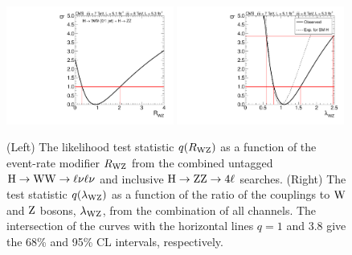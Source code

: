 \documentclass[12pt,twoside,a4paper,cmspaper,final,collab]{cms-tdr}
\begin{document}
\begin{figure}[bhtp]
\centering
\includegraphics[width=0.49\textwidth]{figures/comb/sqr_rwz_scan_1d_ggH_HPA} \hfill
\includegraphics[width=0.49\textwidth]{figures/comb/sqr_lwz_scan_1d_all}
\caption{
(Left) The likelihood test statistic $q(R_{\mathrm{W}\mathrm{Z}})$ as a function of the event-rate modifier $R_{\mathrm{W}\mathrm{Z}}$
from the combined untagged $\mathrm{H} \to \mathrm{W}\mathrm{W} \to \ell\nu\ell\nu$ and
inclusive $\mathrm{H} \to \mathrm{Z}\mathrm{Z} \to  4\ell$ searches.
(Right) The test statistic  $q(\lambda_{\mathrm{W}\mathrm{Z}})$  as a function of the ratio of the couplings to $\mathrm{W}$ and $\mathrm{Z}$
 bosons, $\lambda_{\mathrm{W}\mathrm{Z}}$,
   from the combination of all channels.
The intersection  of the curves with the horizontal lines $q= 1$ and 3.8 give the 68\% and 95\% CL intervals, respectively.
}
\label{fig:fit_rwz_scan}
\end{figure}
\end{document}
